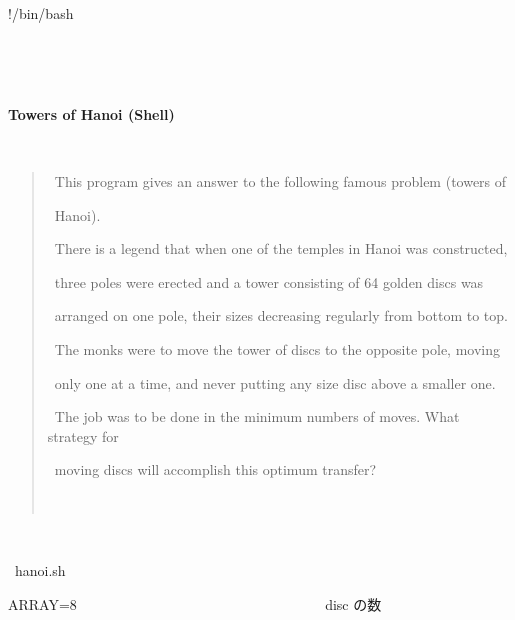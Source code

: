 \documentclass[a4paper,10pt]{article}
\def\mc{\relax}
\begin{document}
\tt\mc 

\noindent
\mbox{}\rm\mc {\tt\#}!/bin/bash
\tt\mc 

\noindent
\mbox{}\rm\mc {\tt\#} \hrulefill 
\tt\mc 

\noindent
\mbox{}\rm\mc {\tt\#} \ %
\tt\mc 

\noindent
\mbox{}\rm\mc {\tt\#} \ \centerline{\bf Towers of Hanoi (Shell)} 
\tt\mc 

\noindent
\mbox{}\rm\mc {\tt\#} \ \begin{quote} 
\tt\mc 

\noindent
\mbox{}\rm\mc {\tt\#} \ This program gives an answer to the following famous problem (towers of 
\tt\mc 

\noindent
\mbox{}\rm\mc {\tt\#} \ Hanoi). 
\tt\mc 

\noindent
\mbox{}\rm\mc {\tt\#} \ There is a legend that when one of the temples in Hanoi was constructed, 
\tt\mc 

\noindent
\mbox{}\rm\mc {\tt\#} \ three poles were erected and a tower consisting of 64 golden discs was 
\tt\mc 

\noindent
\mbox{}\rm\mc {\tt\#} \ arranged on one pole, their sizes decreasing regularly from bottom to top. 
\tt\mc 

\noindent
\mbox{}\rm\mc {\tt\#} \ The monks were to move the tower of discs to the opposite pole, moving 
\tt\mc 

\noindent
\mbox{}\rm\mc {\tt\#} \ only one at a time, and never putting any size disc above a smaller one. 
\tt\mc 

\noindent
\mbox{}\rm\mc {\tt\#} \ The job was to be done in the minimum numbers of moves. What strategy for 
\tt\mc 

\noindent
\mbox{}\rm\mc {\tt\#} \ moving discs will accomplish this optimum transfer? 
\tt\mc 

\noindent
\mbox{}\rm\mc {\tt\#} \ \end{quote} \ %
\tt\mc 

\noindent
\mbox{}\rm\mc {\tt\#} \hrulefill\ hanoi.sh \ \hrulefill
\tt\mc 

\noindent
\mbox{}\hfill

\noindent
\mbox{}ARRAY=8{\tt\mc \ }{\tt\mc \ }{\tt\mc \ }{\tt\mc \ }{\tt\mc \ }{\tt\mc \ }{\tt\mc \ }{\tt\mc \ }{\tt\mc \ }{\tt\mc \ }{\tt\mc \ }{\tt\mc \ }{\tt\mc \ }{\tt\mc \ }{\tt\mc \ }{\tt\mc \ }{\tt\mc \ }{\tt\mc \ }{\tt\mc \ }{\tt\mc \ }{\tt\mc \ }{\tt\mc \ }{\tt\mc \ }{\tt\mc \ }{\tt\mc \ }{\tt\mc \ }{\tt\mc \ }{\tt\mc \ }{\tt\mc \ }{\tt\mc \ }{\tt\mc \ }{\tt\mc \ }{\tt\mc \ }\rm\mc {\tt\#} \ disc の数 \hfill 
\tt\mc 
\end{document}
